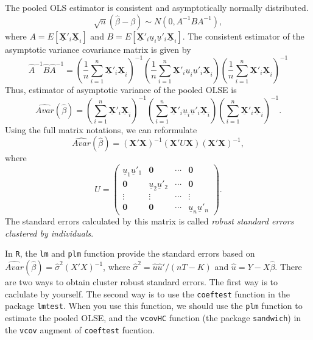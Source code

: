 \documentclass[
  12pt,
]{article}
\begin{document}
The pooled OLS estimator is consistent and asymptotically normally
distributed. \[
  \sqrt{n}(\hat{\beta} - \beta) \sim N(0, A^{-1} B A^{-1}),
\] where \(A = E[\underline{\mathbf{X}}'_i\underline{\mathbf{X}}_i]\)
and
\(B = E[\underline{\mathbf{X}}'_i \underline{u}_i \underline{u}'_i \underline{\mathbf{X}}_i]\).
The consistent estimator of the asymptotic variance covariance matrix is
given by \[
  \hat{A}^{-1} \hat{B} \hat{A}^{-1} = 
  \left( \frac{1}{n} \sum_{i=1}^n \underline{\mathbf{X}}'_i\underline{\mathbf{X}}_i \right)^{-1}
  \left( \frac{1}{n} \sum_{i=1}^n \underline{\mathbf{X}}'_i \underline{u}_i \underline{u}'_i \underline{\mathbf{X}}_i \right)
  \left( \frac{1}{n} \sum_{i=1}^n \underline{\mathbf{X}}'_i\underline{\mathbf{X}}_i \right)^{-1}
\] Thus, estimator of asymptotic variance of the pooled OLSE is \[
  \hat{Avar}(\hat{\beta}) =
  \left( \sum_{i=1}^n \underline{\mathbf{X}}'_i\underline{\mathbf{X}}_i \right)^{-1}
  \left( \sum_{i=1}^n \underline{\mathbf{X}}'_i \underline{u}_i \underline{u}'_i \underline{\mathbf{X}}_i \right)
  \left( \sum_{i=1}^n \underline{\mathbf{X}}'_i\underline{\mathbf{X}}_i \right)^{-1}.
\] Using the full matrix notations, we can reformulate \[
  \hat{Avar}(\hat{\beta}) =
  (\mathbf{X}' \mathbf{X})^{-1}
  (\mathbf{X}' U \mathbf{X})
  (\mathbf{X}' \mathbf{X})^{-1},
\] where \[
  U = 
  \begin{pmatrix}
    \underline{u}_1 \underline{u}'_1 & \mathbf{0} & \cdots & \mathbf{0} \\
    \mathbf{0} & \underline{u}_2 \underline{u}'_2 & \cdots & \mathbf{0} \\
    \vdots & \vdots & \cdots & \vdots \\
    \mathbf{0} & \mathbf{0} & \cdots & \underline{u}_n \underline{u}'_n
  \end{pmatrix}.
\] The standard errors calculated by this matrix is called \emph{robust
standard errors clustered by individuals}.

In \texttt{R}, the \texttt{lm} and \texttt{plm} function provide the
standard errors based on
\(\hat{Avar}(\hat{\beta}) = \hat{\sigma}^2 (X'X)^{-1}\), where
\(\hat{\sigma}^2 = \hat{u}\hat{u}'/(nT - K)\) and
\(\hat{u} = Y - X \hat{\beta}\). There are two ways to obtain cluster
robust standard errors. The first way is to caclulate by yourself. The
second way is to use the \texttt{coeftest} function in the package
\texttt{lmtest}. When you use this function, we should use the
\texttt{plm} function to estimate the pooled OLSE, and the
\texttt{vcovHC} function (the package \texttt{sandwich}) in the
\texttt{vcov} augment of \texttt{coeftest} fucntion.
\end{document}
